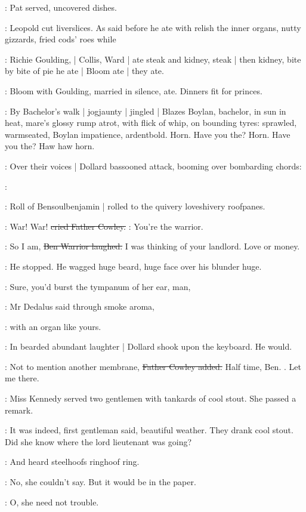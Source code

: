 :
Pat served,
uncovered dishes.

:
Leopold cut liverslices.
As said before he ate with relish the inner organs,
nutty gizzards,
fried cods' roes while

:
Richie Goulding, |
Collis, Ward |
ate steak and kidney,
steak |
then kidney,
bite by bite of pie he ate |
Bloom ate |
they ate.

:
Bloom with Goulding,
married in silence,
ate.
Dinners fit for princes.

:
By Bachelor's walk |
jogjaunty |
jingled |
Blazes Boylan,
bachelor,
in sun
in heat,
mare's glossy rump atrot,
with flick of whip,
on bounding tyres:
sprawled,
warmseated,
Boylan impatience,
ardentbold.
Horn.
Have you the?
Horn.
Have you the?
Haw haw horn.

:
Over their voices |
Dollard bassooned attack,
booming over bombarding chords:

\dollard:

:
Roll of Bensoulbenjamin |
rolled to the quivery loveshivery roofpanes.

\cowley:
War!
War!
\sout{cried Father Cowley.}
\cowley:
You're the warrior.

\dollard:
So I am,
\sout{Ben Warrior laughed.}
I was thinking of your landlord.
Love or money.

:
He stopped.
He wagged huge beard,
huge face over his blunder huge.

\simon:
Sure,
you'd burst the tympanum of her ear,
man,

:
Mr Dedalus said through smoke aroma,

\simon:
with an organ like yours.

:
In bearded abundant laughter |
Dollard shook upon the keyboard.
He would.

\cowley:
Not to mention another membrane,
\sout{Father Cowley added.}
Half time, Ben.
.
Let me there.

:
Miss Kennedy served two gentlemen with tankards of cool stout.
She passed a remark.

:
It was indeed,
first gentleman said,
beautiful weather.
They drank cool stout.
Did she know where the lord lieutenant was going?

:
And heard steelhoofs ringhoof ring.

:
No,
she couldn't say.
But it would be in the paper.

:
O, she need not trouble.

